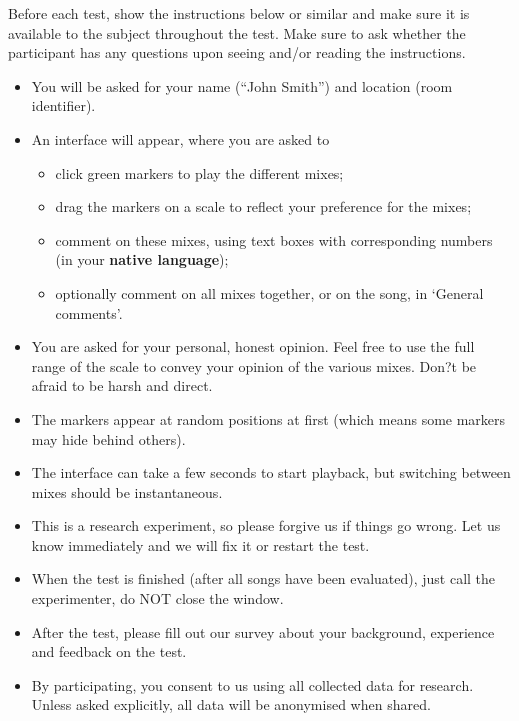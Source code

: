 \documentclass[11pt, oneside]{article}   	%
\begin{document}
	Before each test, show the instructions below or similar and make sure it is available to the subject throughout the test. Make sure to ask whether the participant has any questions upon seeing and/or reading the instructions. 
			
	\begin{itemize}
		\item You will be asked for your name (``John Smith'') and location (room identifier). 
		\item An interface will appear, where you are asked to 
		\begin{itemize}
			\item click green markers to play the different mixes;
			\item drag the markers on a scale to reflect your preference for the mixes;
			\item comment on these mixes, using text boxes with corresponding numbers (in your \textbf{native language});
			\item optionally comment on all mixes together, or on the song, in `General comments'. 
		\end{itemize}
		\item You are asked for your personal, honest opinion. Feel free to use the full range of the scale to convey your opinion of the various mixes. Don?t be afraid to be harsh and direct. 
		\item The markers appear at random positions at first (which means some markers may hide behind others). 
		\item The interface can take a few seconds to start playback, but switching between mixes should be instantaneous. 
		\item This is a research experiment, so please forgive us if things go wrong. Let us know immediately and we will fix it or restart the test.  
		\item When the test is finished (after all songs have been evaluated), just call the experimenter, do NOT close the window.  
		\item After the test, please fill out our survey about your background, experience and feedback on the test. 
		\item By participating, you consent to us using all collected data for research. Unless asked explicitly, all data will be anonymised when shared. 
	\end{itemize}

\clearpage
\end{document}
